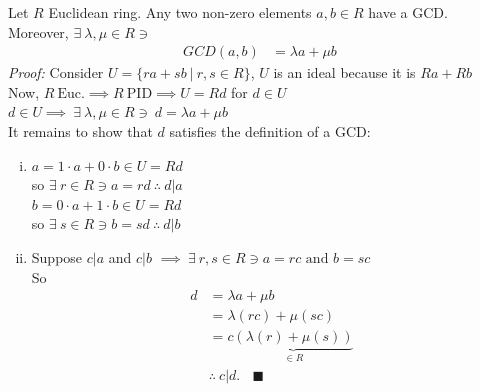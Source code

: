 \begin{lemma}
    Let $R$ Euclidean ring. Any two non-zero elements $a,b \in R$ have a GCD. Moreover, $\exists \ \lambda, \mu \in R \ni$
    \begin{align}
        GCD(a,b) &= \lambda a + \mu b \nonumber
    \end{align}
    \textit{Proof:} Consider $U=\{ra+sb \ | \ r,s \in R \}$, $U$ is an ideal because it is $Ra+Rb$ \\ \steezybreak
    Now, $R\ \text{Euc.} \implies R \ \text{PID} \implies U=Rd$ for $d\in U$ \\ \steezybreak
    $d\in U \implies \ \exists \ \lambda, \mu \in R \ni \ d=\lambda a + \mu b$ \\ \steezybreak
    It remains to show that $d$ satisfies the definition of a GCD: \\
    \begin{enumerate}[(i)]
        \item $a=1\cdot a + 0\cdot b\in U = Rd$\\
        so $\exists \ r\in R \ni a=rd \ \therefore \ d|a$ \\
        $b=0\cdot a + 1\cdot b \in U = Rd$ \\
        so $\exists \ s\in R \ni b=sd \ \therefore \ d|b$ \\
        \item Suppose $c|a$ and $c|b$  $\implies \ \exists \ r,s \in R \ni a=rc  \text{ and } b=sc$ \\
        So
        \begin{align}
            d &=\lambda a + \mu b \nonumber \\
            &= \lambda (rc) + \mu (sc) \nonumber \\
            &= c \underbrace{(\lambda(r) + \mu (s))}_{\in R} \nonumber \\
            &\therefore \ c|d. \ \ \ \ \blacksquare \nonumber
        \end{align} 
        
    \end{enumerate}
\end{lemma}
